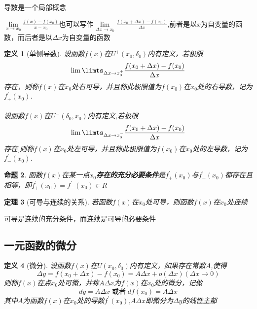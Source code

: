 \documentclass[12pt, a4paper, oneside]{ctexart}
\newtheorem{theorem}{定理}[section]
\newtheorem{definition}[theorem]{定义}
\newtheorem{proposition}[theorem]{命题}
\begin{document}
\begin{remark}
导数是一个局部概念
\end{remark}

\begin{note}

$ \lim\limits_{x\to x_0}\frac{f(x)-f(x_0)}{x-x_0}$也可以写作$\lim\limits_{\Delta x\to x_0}\frac{f(x_0+\Delta x)-f(x_0)}{\Delta x}$,前者是以$x$为自变量的函数，而后者是以$\Delta x$为自变量的函数\\
\end{note}



\begin{definition}[单侧导数]
设函数$f(x)$在$U^{+}(x_0,\delta_0)$内有定义，若极限
\begin{equation}
    \lim\limts_{\Delta x\to x_0^{+}}\frac{f(x_0+\Delta x)-f(x_0)}{\Delta x}
\end{equation}
存在，则称$f(x)$在$x_0$处右可导，并且称此极限值为$f(x_0)$在$x_0$处的右导数，记为$f^{'}_{+}(x_0)$.\\~\\
设函数$f(x)$在$U^{-}(\delta_0,x_0)$内有定义,若极限
\begin{equation}
   \lim\limts_{\Delta x\to x_0^{-}}\frac{f(x_0+\Delta x)-f(x_0)}{\Delta x}
\end{equation}
存在,则称$f(x)$在$x_0$处左可导，并且称此极限值为$f(x_0)$在$x_0$处的左导数，记为$f^{'}_{-}(x_0)$.\\
\end{definition}

\begin{proposition}
函数$f(x)$在某一点$x_0$\textbf{存在的充分必要条件}是$f^{'}_{+}(x_0)$与$f^{'}_{-}(x_0)$都存在且相等，即$f^{'}_{+}(x_0)=f^{'}_{-}(x_0) \in R $
\end{proposition}

\begin{theorem}[可导与连续的关系]
若函数$f(x)$在$x_0$处可导，则函数$f(x)$在$x_0$处连续
\end{theorem}

\begin{remark}
可导是连续的充分条件，而连续是可导的必要条件
\end{remark}

\subsection{一元函数的微分}

\begin{definition}[微分]
设函数$f(x)$在$U(x_0,\delta_0)$内有定义，如果存在常数$A$,使得
\begin{equation}
    \Delta y=f(x_0+\Delta x)-f(x_0)=A\Delta x+o(\Delta x) (\Delta x \to 0)
\end{equation}
则称$f(x)$在点$x_0$处可微，并称$A\Delta x$为$f(x)$在$x_0$处的微分，记做
\begin{equation}
    dy=A\Delta x \;\mbox{或者}\; df(x_0)=A\Delta x
\end{equation}
其中$A$为函数$f(x)$在$x_0$处的导数$f^{'}(x_0)$,$A\Delta x$即微分为$\Delta y$的线性主部
\end{definition}
\end{document}
